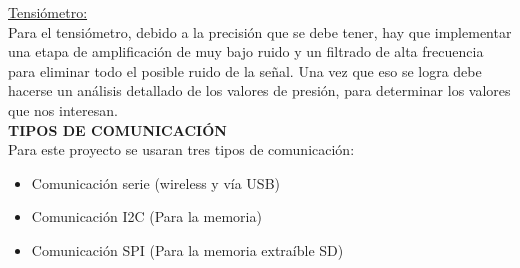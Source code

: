 \documentclass[11pt]{report}
\begin{document}
\noindent \underline{Tensiómetro:} \\
Para el tensiómetro, debido a la precisión que se debe tener, hay que implementar una etapa de amplificación de muy bajo ruido y un filtrado de alta frecuencia para eliminar todo el posible ruido de la señal. Una vez que eso se logra debe hacerse un análisis detallado de los valores de presión, para determinar los valores que nos interesan.\\

\noindent \large \textbf{ TIPOS DE COMUNICACIÓN}\\

Para este proyecto se usaran tres tipos de comunicación: \\

\begin{itemize}
	\item Comunicación serie (wireless y vía USB) \\
	\item Comunicación I2C (Para la memoria) \\
	\item  Comunicación SPI (Para la memoria extraíble SD) \\
\end{itemize}
\end{document}
